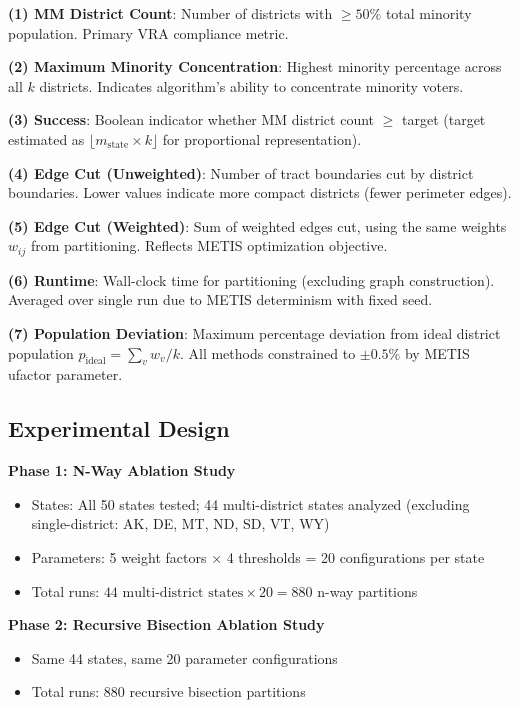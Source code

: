 \textbf{(1) MM District Count}: Number of districts with $\geq 50\%$ total minority population. Primary VRA compliance metric.

\textbf{(2) Maximum Minority Concentration}: Highest minority percentage across all $k$ districts. Indicates algorithm's ability to concentrate minority voters.

\textbf{(3) Success}: Boolean indicator whether MM district count $\geq$ target (target estimated as $\lfloor m_{\text{state}} \times k \rfloor$ for proportional representation).

\textbf{(4) Edge Cut (Unweighted)}: Number of tract boundaries cut by district boundaries. Lower values indicate more compact districts (fewer perimeter edges).

\textbf{(5) Edge Cut (Weighted)}: Sum of weighted edges cut, using the same weights $w_{ij}$ from partitioning. Reflects METIS optimization objective.

\textbf{(6) Runtime}: Wall-clock time for partitioning (excluding graph construction). Averaged over single run due to METIS determinism with fixed seed.

\textbf{(7) Population Deviation}: Maximum percentage deviation from ideal district population $p_{\text{ideal}} = \sum_v w_v / k$. All methods constrained to $\pm 0.5\%$ by METIS ufactor parameter.

\subsection{Experimental Design}

\textbf{Phase 1: N-Way Ablation Study}
\begin{itemize}
\item States: All 50 states tested; 44 multi-district states analyzed (excluding single-district: AK, DE, MT, ND, SD, VT, WY)
\item Parameters: 5 weight factors $\times$ 4 thresholds = 20 configurations per state
\item Total runs: $44 \text{ multi-district states} \times 20 = 880$ n-way partitions
\end{itemize}

\textbf{Phase 2: Recursive Bisection Ablation Study}
\begin{itemize}
\item Same 44 states, same 20 parameter configurations
\item Total runs: 880 recursive bisection partitions
\end{itemize}

